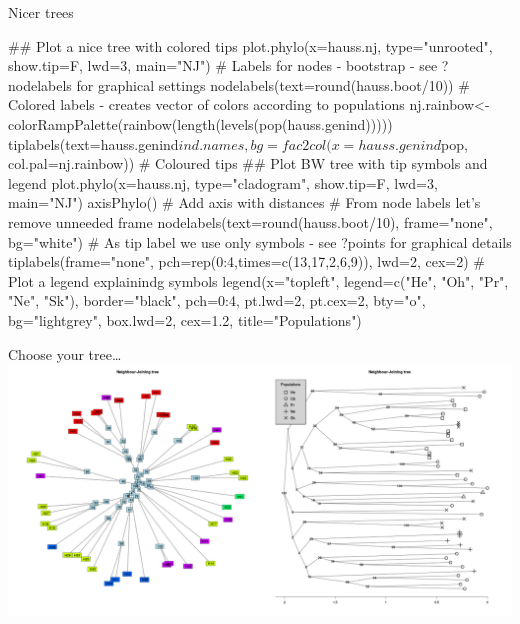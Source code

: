 \documentclass[compress, ucs, xelatex, 11pt, xcolor=svgnames,
  hyperref={
    bookmarks=true,
    unicode=true,
    colorlinks=true,
    pdftitle={Molecular data in R},
    plainpages=false,
    pdfauthor={Vojtech Zeisek},
    pdfsubject={Course about phylogeny and evolution in R},
    pdfcreator={XeLaTeX},
    pdfkeywords={R, evolution, phylogeny, molecular data},
    linkcolor=Tomato,
    anchorcolor=SaddleBrown,
    citecolor=Goldenrod,
    filecolor=DarkMagenta,
    menucolor=Sienna,
    urlcolor=DarkTurquoise,
    pdftex},
  url={hyphens, lowtilde} %
  ]{beamer}
\begin{document}
\begin{frame}[fragile]{Nicer trees}
  \begin{footnotesize}
  \begin{spluscode}
    ## Plot a nice tree with colored tips
    plot.phylo(x=hauss.nj, type="unrooted", show.tip=F, lwd=3, main="NJ")
    # Labels for nodes - bootstrap - see ?nodelabels for graphical settings
    nodelabels(text=round(hauss.boot/10))
    # Colored labels - creates vector of colors according to populations
    nj.rainbow<-colorRampPalette(rainbow(length(levels(pop(hauss.genind)))))
    tiplabels(text=hauss.genind$ind.names, bg=fac2col(x=hauss.genind$pop,
      col.pal=nj.rainbow)) # Coloured tips
    ## Plot BW tree with tip symbols and legend
    plot.phylo(x=hauss.nj, type="cladogram", show.tip=F, lwd=3, main="NJ")
    axisPhylo() # Add axis with distances
    # From node labels let's remove unneeded frame
    nodelabels(text=round(hauss.boot/10), frame="none", bg="white")
    # As tip label we use only symbols - see ?points for graphical details
    tiplabels(frame="none", pch=rep(0:4,times=c(13,17,2,6,9)), lwd=2, cex=2)
    # Plot a legend explainindg symbols
    legend(x="topleft", legend=c("He", "Oh", "Pr", "Ne", "Sk"), 
      border="black", pch=0:4, pt.lwd=2, pt.cex=2, bty="o", bg="lightgrey",
      box.lwd=2, cex=1.2, title="Populations")
  \end{spluscode}
  \end{footnotesize}
\end{frame}

\begin{frame}{Choose your tree\ldots}
\includegraphics[width=\textwidth]{nj2.png}
\end{frame}
\end{document}

